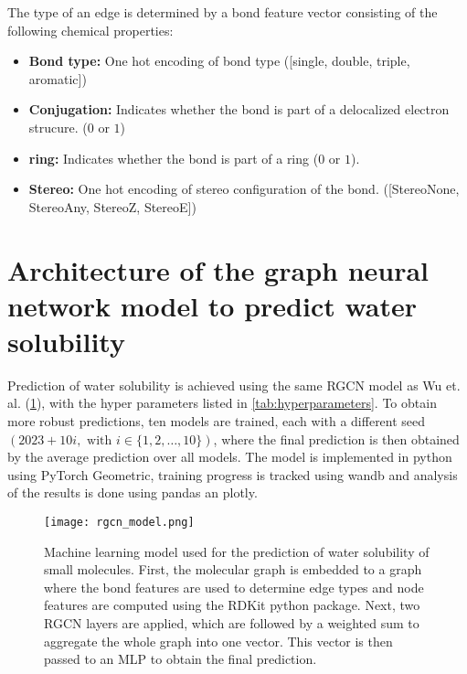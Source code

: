 The type of an edge is determined by a bond feature vector consisting of the following chemical properties:


\begin{itemize}
    \item \textbf{Bond type:} One hot encoding of bond type ([single, double, triple, aromatic])
    \item \textbf{Conjugation:} Indicates whether the bond is part of a delocalized electron strucure.
        ($0$ or $1$) 
    \item \textbf{ring:} Indicates whether the bond is part of a ring ($0$ or $1$).
    \item \textbf{Stereo:} One hot encoding of stereo configuration of the bond.
        ([StereoNone, StereoAny, StereoZ, StereoE])
\end{itemize}


\section{Architecture of the graph neural network model to predict water solubility}


Prediction of water solubility is achieved using the same RGCN model as Wu et. al. (\cref{fig:ml_model}),
with the hyper parameters listed in \cref{tab:hyperparameters}. To obtain more 
robust predictions, ten models are trained, each with a different seed 
$(2023 + 10i, \text{ with } i \in \{1, 2, \dots, 10\})$, where the final 
prediction is then obtained by the average prediction over all models.\cite{wu2023chemistry} 
The model is implemented in python using PyTorch Geometric\cite{Fey/Lenssen/2019}, training progress 
is tracked using wandb\cite{wandb} and analysis of the results is done using 
pandas\cite{reback2020pandas} an plotly\cite{plotly}.


\begin{figure}[h]
    \centering
    \texttt{[image: rgcn\_model.png]}
    \caption{Machine learning model used for the prediction of water solubility of 
        small molecules. First, the molecular graph is embedded to a graph where the 
        bond features are used to determine edge types and node features are computed 
        using the RDKit python package. Next, two RGCN layers are applied, which are 
        followed by a weighted sum to aggregate the whole graph into one vector. This 
        vector is then passed to an MLP to obtain the final prediction.
    }
    \label{fig:ml_model}
\end{figure}


